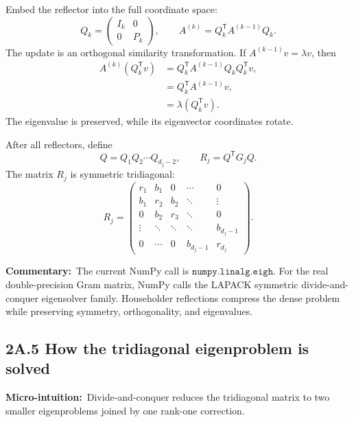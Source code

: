 \documentclass[10pt,twocolumn]{article}
\newcommand{\micro}[1]{\par\noindent\textbf{Micro-intuition:}\ #1\par}
\newcommand{\commentary}[1]{\par\noindent\textbf{Commentary:}\ #1\par}
\newcommand{\conceptbreak}{\par\medskip\noindent{\color{black!30}\rule{\columnwidth}{0.35pt}}\par\medskip}
\begin{document}
Embed the reflector into the full coordinate space:
\begin{equation}
Q_k=
\begin{pmatrix}
I_k&0\\
0&P_k
\end{pmatrix},
\qquad
A^{(k)}=Q_k^{\mathsf T}A^{(k-1)}Q_k.
\label{eq:bridge-householder-similarity}
\end{equation}
The update is an orthogonal similarity transformation. If
\(A^{(k-1)}v=\lambda v\), then
\begin{align}
A^{(k)}(Q_k^{\mathsf T}v)
&=Q_k^{\mathsf T}A^{(k-1)}Q_kQ_k^{\mathsf T}v,
\label{eq:bridge-similarity-proof-1}\\
&=Q_k^{\mathsf T}A^{(k-1)}v,
\label{eq:bridge-similarity-proof-2}\\
&=\lambda(Q_k^{\mathsf T}v).
\label{eq:bridge-similarity-proof-3}
\end{align}
The eigenvalue is preserved, while its eigenvector coordinates rotate.

After all reflectors, define
\begin{equation}
Q=Q_1Q_2\cdots Q_{d_j-2},
\qquad
R_j=Q^{\mathsf T}G_jQ.
\label{eq:bridge-tridiagonal-reduction}
\end{equation}
The matrix \(R_j\) is symmetric tridiagonal:
\begin{equation}
R_j=
\begin{pmatrix}
r_1&b_1&0&\cdots&0\\
b_1&r_2&b_2&\ddots&\vdots\\
0&b_2&r_3&\ddots&0\\
\vdots&\ddots&\ddots&\ddots&b_{d_j-1}\\
0&\cdots&0&b_{d_j-1}&r_{d_j}
\end{pmatrix}.
\label{eq:bridge-tridiagonal-array}
\end{equation}

\commentary{The current NumPy call is \(\mathtt{numpy.linalg.eigh}\). For the
real double-precision Gram matrix, NumPy calls the LAPACK symmetric
divide-and-conquer eigensolver family. Householder reflections compress the
dense problem while preserving symmetry, orthogonality, and eigenvalues.}

\conceptbreak

\subsection*{2A.5 How the tridiagonal eigenproblem is solved}

\micro{Divide-and-conquer reduces the tridiagonal matrix to two smaller
eigenproblems joined by one rank-one correction.}
\end{document}
